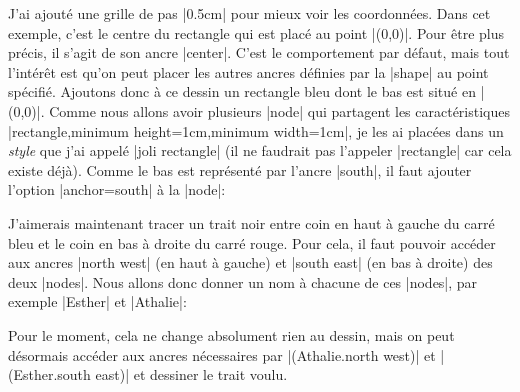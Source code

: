 \documentclass[a4paper]{ltxdoc}
\begin{document}
%
\begin{codeexample}[width=5cm]
\end{codeexample}
%
J'ai ajouté une grille de pas |0.5cm| pour mieux voir les coordonnées. Dans cet exemple, c'est le centre du rectangle qui est placé au point |(0,0)|. Pour être plus précis, il s'agit de son ancre |center|. C'est le comportement par défaut, mais tout l'intérêt est qu'on peut placer les autres ancres définies par la |shape| au point spécifié. Ajoutons donc à ce dessin un rectangle bleu dont le bas est situé en |(0,0)|. Comme nous allons avoir plusieurs |node| qui partagent les caractéristiques |rectangle,minimum height=1cm,minimum width=1cm|, je les ai placées dans un \emph{style} que j'ai appelé |joli rectangle| (il ne faudrait pas l'appeler |rectangle| car cela existe déjà). Comme le bas est représenté par l'ancre |south|, il faut ajouter l'option |anchor=south| à la |node|:
%
\begin{codeexample}[width=5cm]
\end{codeexample}
%
J'aimerais maintenant tracer un trait noir entre coin en haut à gauche du carré bleu et le coin en bas à droite du carré rouge. Pour cela, il faut pouvoir accéder aux ancres |north west| (en haut à gauche) et |south east| (en bas à droite) des deux |nodes|. Nous allons donc donner un nom à chacune de ces |nodes|, par exemple |Esther| et |Athalie|:
%
\begin{codeexample}[width=5cm]
\end{codeexample}
%
Pour le moment, cela ne change absolument rien au dessin, mais on peut désormais accéder aux ancres nécessaires par |(Athalie.north west)| et |(Esther.south east)| et dessiner le trait voulu.
\end{document}
